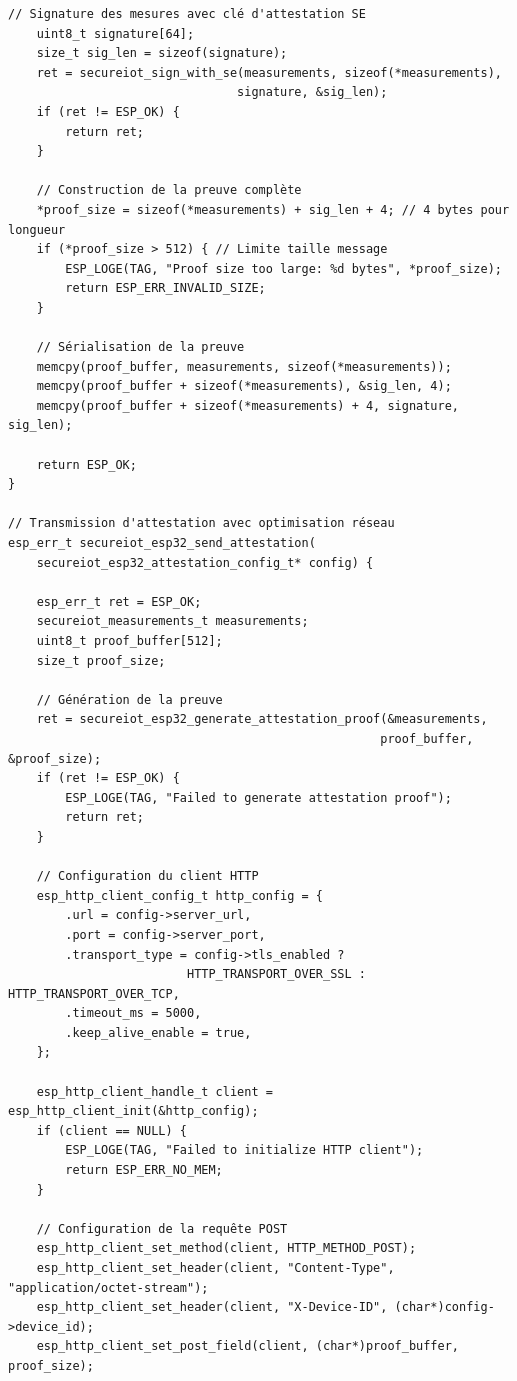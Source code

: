 \begin{lstlisting}[caption={Module d'attestation ESP32 optimisé}]
    // Signature des mesures avec clé d'attestation SE
    uint8_t signature[64];
    size_t sig_len = sizeof(signature);
    ret = secureiot_sign_with_se(measurements, sizeof(*measurements), 
                                signature, &sig_len);
    if (ret != ESP_OK) {
        return ret;
    }
    
    // Construction de la preuve complète
    *proof_size = sizeof(*measurements) + sig_len + 4; // 4 bytes pour longueur
    if (*proof_size > 512) { // Limite taille message
        ESP_LOGE(TAG, "Proof size too large: %d bytes", *proof_size);
        return ESP_ERR_INVALID_SIZE;
    }
    
    // Sérialisation de la preuve
    memcpy(proof_buffer, measurements, sizeof(*measurements));
    memcpy(proof_buffer + sizeof(*measurements), &sig_len, 4);
    memcpy(proof_buffer + sizeof(*measurements) + 4, signature, sig_len);
    
    return ESP_OK;
}

// Transmission d'attestation avec optimisation réseau
esp_err_t secureiot_esp32_send_attestation(
    secureiot_esp32_attestation_config_t* config) {
    
    esp_err_t ret = ESP_OK;
    secureiot_measurements_t measurements;
    uint8_t proof_buffer[512];
    size_t proof_size;
    
    // Génération de la preuve
    ret = secureiot_esp32_generate_attestation_proof(&measurements, 
                                                    proof_buffer, &proof_size);
    if (ret != ESP_OK) {
        ESP_LOGE(TAG, "Failed to generate attestation proof");
        return ret;
    }
    
    // Configuration du client HTTP
    esp_http_client_config_t http_config = {
        .url = config->server_url,
        .port = config->server_port,
        .transport_type = config->tls_enabled ? 
                         HTTP_TRANSPORT_OVER_SSL : HTTP_TRANSPORT_OVER_TCP,
        .timeout_ms = 5000,
        .keep_alive_enable = true,
    };
    
    esp_http_client_handle_t client = esp_http_client_init(&http_config);
    if (client == NULL) {
        ESP_LOGE(TAG, "Failed to initialize HTTP client");
        return ESP_ERR_NO_MEM;
    }
    
    // Configuration de la requête POST
    esp_http_client_set_method(client, HTTP_METHOD_POST);
    esp_http_client_set_header(client, "Content-Type", "application/octet-stream");
    esp_http_client_set_header(client, "X-Device-ID", (char*)config->device_id);
    esp_http_client_set_post_field(client, (char*)proof_buffer, proof_size);
    

\end{lstlisting}
